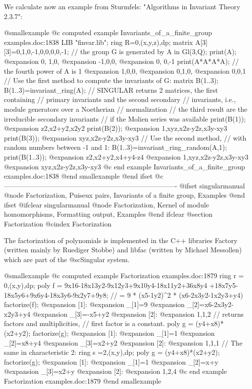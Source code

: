 We calculate now an example from Sturmfels: "Algorithms in Invariant
Theory 2.3.7":

@smallexample
@c computed example Invariants_of_a_finite_group examples.doc:1838 
  LIB "finvar.lib";
  ring R=0,(x,y,z),dp;
  matrix A[3][3]=0,1,0,-1,0,0,0,0,-1;
  // the group G is generated by A in Gl(3,Q);
  print(A);
@expansion{} 0, 1,0,
@expansion{} -1,0,0,
@expansion{} 0, 0,-1
  print(A*A*A*A); // the fourth power of A is 1
@expansion{} 1,0,0,
@expansion{} 0,1,0,
@expansion{} 0,0,1 
  // Use the first method to compute the invariants of G:
  matrix B(1..3);
  B(1..3)=invariant_ring(A);
  // SINGULAR returns 2 matrices, the first containing
  // primary invariants and the second secondary
  // invariants, i.e., module generators over a Noetherian
  // normalization
  // the third result are the irreducible secondary invariants
  // if the Molien series was available
  print(B(1));
@expansion{} z2,x2+y2,x2y2
  print(B(2));
@expansion{} 1,xyz,x2z-y2z,x3y-xy3
  print(B(3));
@expansion{} xyz,x2z-y2z,x3y-xy3
  // Use the second method,
  // with random numbers between -1 and 1:
  B(1..3)=invariant_ring_random(A,1);
  print(B(1..3));
@expansion{} z2,x2+y2,x4+y4-z4
@expansion{} 1,xyz,x2z-y2z,x3y-xy3
@expansion{} xyz,x2z-y2z,x3y-xy3
@c end example Invariants_of_a_finite_group examples.doc:1838
@end smallexample
@end ifset
@c ----------------------------------------------------------------------------
@ifset singularmanual
@node Factorization, Puiseux pairs, Invariants of a finite group, Examples
@end ifset
@ifclear singularmanual
@node Factorization, Kernel of module homomorphisms, Formatting output, Examples
@end ifclear
@section Factorization
@cindex Factorization

The factorization of polynomials is implemented in the C++ libraries
Factory (written mainly by Ruediger Stobbe) and libfac (written by
Michael Messollen) which are part of the @sc{Singular} system.

@smallexample
@c computed example Factorization examples.doc:1879 
  ring r = 0,(x,y),dp;
  poly f = 9x16-18x13y2-9x12y3+9x10y4-18x11y2+36x8y4
         +18x7y5-18x5y6+9x6y4-18x3y6-9x2y7+9y8;
  // = 9 * (x5-1y2)^2 * (x6-2x3y2-1x2y3+y4)
  factorize(f);
@expansion{} [1]:
@expansion{}    _[1]=9
@expansion{}    _[2]=x6-2x3y2-x2y3+y4
@expansion{}    _[3]=-x5+y2
@expansion{} [2]:
@expansion{}    1,1,2
  // returns factors and multiplicities,
  // first factor is a constant.
  poly g = (y4+x8)*(x2+y2);
  factorize(g);
@expansion{} [1]:
@expansion{}    _[1]=1
@expansion{}    _[2]=x8+y4
@expansion{}    _[3]=x2+y2
@expansion{} [2]:
@expansion{}    1,1,1
  // The same in characteristic 2:
  ring s =2,(x,y),dp;
  poly g = (y4+x8)*(x2+y2);
  factorize(g);
@expansion{} [1]:
@expansion{}    _[1]=1
@expansion{}    _[2]=x+y
@expansion{}    _[3]=x2+y
@expansion{} [2]:
@expansion{}    1,2,4
@c end example Factorization examples.doc:1879
@end smallexample

